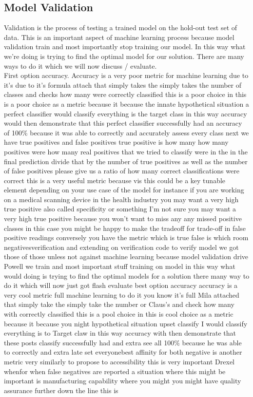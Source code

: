 \documentclass{UoNMCHA}
\numberwithin{equation}{section}
\begin{document}
\subsection{Model Validation}
Validation is the process of testing a trained model on the hold-out test set of data. This is an important aspect of machine learning process because model validation train and most importantly stop training our model. In this way what we're doing is trying to find the optimal model for our solution. There are many ways to do it which we will now discuss / evaluate. \\
First option accuracy. Accuracy is a very poor metric for machine learning due to it's due to it's formula attach that simply takes the simply takes the number of classes and checks how many were correctly classified this is a poor choice in this is a poor choice as a metric because it because the innate hypothetical situation a perfect classifier would classify everything is the target class in this way accuracy would then demonstrate that this perfect classifier successfully had an accuracy of 100\% because it was able to correctly and accurately assess every class next we have true positives and false positives true positive is how many how many positives were how many real positives that we tried to classify were in the in the final prediction divide that by the number of true positives as well as the number of false positives please give us a ratio of how many correct classifications were correct this is a very useful metric because vis this could be a key tunable element depending on your use case of the model for instance if you are working on a medical scanning device in the health industry you may want a very high true positive also called specificity or something I'm not sure you may want a very high true positive because you won't want to miss any any missed positive classes in this case you might be happy to make the tradeoff for trade-off in false positive readings conversely you have the metric which is true false is which room negativesverification and extending on verification code to verify model we got those of those unless not against machine learning because model validation drive Powell we train and most important stuff training on model in this way what would doing is trying to find the optimal models for a solution there many way to do it which will now just got flash evaluate best option accuracy accuracy is a very cool metric full machine learning to do it you know it's full Mila attached that simply take the simply take the number or Claus's and check how many with correctly classified this is a pool choice in this is cool choice as a metric because it because you night hypothetical situation upset classify I would classify everything is to Target claw in this way accuracy with then demonstrate that these posts classify successfully had and extra see all 100\% because he was able to correctly and extra late set everyonebest affinity for both negative is another metric very similarly to propose to accessibility this is very important Drexel whenfor when false negatives are reported a situation where this might be important is manufacturing capability where you might you might have quality assurance further down the line this is 
\end{document}

